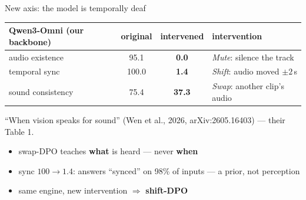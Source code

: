 \documentclass[aspectratio=169,11pt]{beamer}
\begin{document}
\begin{frame}{New axis: the model is temporally deaf}
\centering\small
\renewcommand{\arraystretch}{1.2}
\begin{tabular}{l cc l}
\toprule
Qwen3-Omni (our backbone) & original & intervened & intervention \\
\midrule
audio existence   & 95.1  & \textcolor{red!70!black}{\textbf{0.0}}  & \emph{Mute}: silence the track \\
temporal sync     & 100.0 & \textcolor{red!70!black}{\textbf{1.4}}  & \emph{Shift}: audio moved $\pm2$\,s \\
sound consistency & 75.4  & \textcolor{red!70!black}{\textbf{37.3}} & \emph{Swap}: another clip's audio \\
\bottomrule
\end{tabular}
\par\vspace{0.4em}
{\scriptsize ``When vision speaks for sound'' (Wen et al., 2026, arXiv:2605.16403) --- their Table 1.}
\vfill
\begin{itemize}\footnotesize
\item swap-DPO teaches \textbf{what} is heard --- never \textbf{when}
\item sync $100\to1.4$: answers ``synced'' on 98\% of inputs --- a prior, not perception
\item same engine, new intervention $\Rightarrow$ \textbf{shift-DPO}
\end{itemize}
\end{frame}
\end{document}

